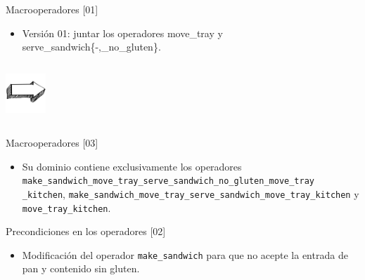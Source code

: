 \documentclass{beamer}
\begin{document}
\begin{frame}{Macrooperadores [01]}
    \begin{itemize}
        \item Versión 01: juntar los operadores move\_tray y serve\_sandwich\{-,\_no\_gluten\}.
    \end{itemize}
    
    \begin{columns}
    \parbox{2in}{\shadowbox{
    
    }}
    
    \parbox{2in}{\shadowbox{
    
    }}
    
    \begin{flushright}
    \includegraphics[width=1.5cm,height=1.5cm]{arrow}
    \end{flushright}
    
    \parbox{2in}{\shadowbox{
        
        }}
    \end{columns}
\end{frame}


\begin{frame}{Macrooperadores [03]}
\begin{itemize}
    \item Su dominio contiene exclusivamente los operadores \texttt{make\_sandwich\_move\_tray\_serve\_sandwich\_no\_gluten\_move\_tray} \texttt{\_kitchen}, \texttt{make\_sandwich\_move\_tray\_serve\_sandwich\_move\_tray\_kitchen} y \texttt{move\_tray\_kitchen}.
\end{itemize}

\end{frame}


\begin{frame}{Precondiciones en los operadores [02]}
    
    \begin{itemize}
    
        \item Modificación del operador \texttt{make\_sandwich} para que no acepte la entrada de pan y contenido sin gluten.
    \end{itemize}
    
    \parbox{2in}{\shadowbox{
        
        }}

\end{frame}
\end{document}
